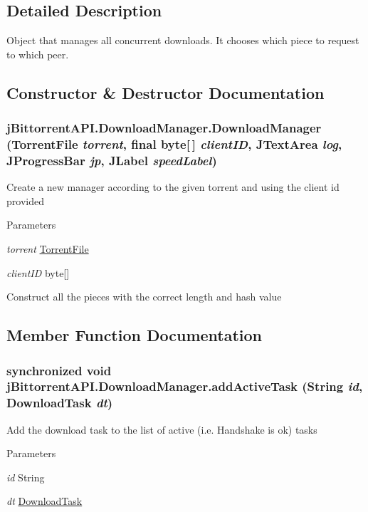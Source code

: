\subsection{Detailed Description}
Object that manages all concurrent downloads. It chooses which piece to request to which peer. 

\subsection{Constructor \& Destructor Documentation}
\hypertarget{classj_bittorrent_a_p_i_1_1_download_manager_a8fd6a72325826a055cf5a7c85d80830a}{
\subsubsection[{DownloadManager}]{\setlength{\rightskip}{0pt plus 5cm}jBittorrentAPI.DownloadManager.DownloadManager ({\bf TorrentFile} {\em torrent}, \/  final byte\mbox{[}$\,$\mbox{]} {\em clientID}, \/  JTextArea {\em log}, \/  JProgressBar {\em jp}, \/  JLabel {\em speedLabel})}}
\label{classj_bittorrent_a_p_i_1_1_download_manager_a8fd6a72325826a055cf5a7c85d80830a}
Create a new manager according to the given torrent and using the client id provided 
\begin{DoxyParams}{Parameters}
\item[{\em torrent}]\hyperlink{classj_bittorrent_a_p_i_1_1_torrent_file}{TorrentFile} \item[{\em clientID}]byte\mbox{[}\mbox{]} \end{DoxyParams}


Construct all the pieces with the correct length and hash value

\subsection{Member Function Documentation}
\hypertarget{classj_bittorrent_a_p_i_1_1_download_manager_a753e445be7616198024e9e7eefdede79}{
\subsubsection[{addActiveTask}]{\setlength{\rightskip}{0pt plus 5cm}synchronized void jBittorrentAPI.DownloadManager.addActiveTask (String {\em id}, \/  {\bf DownloadTask} {\em dt})}}
\label{classj_bittorrent_a_p_i_1_1_download_manager_a753e445be7616198024e9e7eefdede79}
Add the download task to the list of active (i.e. Handshake is ok) tasks 
\begin{DoxyParams}{Parameters}
\item[{\em id}]String \item[{\em dt}]\hyperlink{classj_bittorrent_a_p_i_1_1_download_task}{DownloadTask} \end{DoxyParams}


